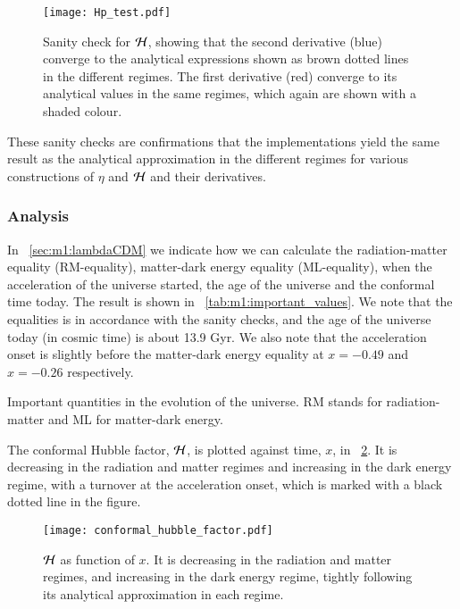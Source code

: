    \begin{figure}
        \texttt{[image: Hp\_test.pdf]}
        \caption{Sanity check for $\mathcal{H}$, showing that the second derivative (blue) converge to the analytical expressions shown as brown dotted lines in the different regimes. The first derivative (red) converge to its analytical values in the same regimes, which again are shown with a shaded colour.}
        \label{fig:m1:Hp_tests}
    \end{figure}

    These sanity checks are confirmations that the implementations yield the same result as the analytical approximation in the different regimes for various constructions of $\eta$ and $\mathcal{H}$ and their derivatives.
    
\subsubsection{Analysis}

    In ~\cref{sec:m1:lambdaCDM} we indicate how we can calculate the radiation-matter equality (RM-equality), matter-dark energy equality (ML-equality), when the acceleration of the universe started, the age of the universe and the conformal time today. The result is shown in ~\cref{tab:m1:important_values}. We note that the equalities is in accordance with the sanity checks, and the age of the universe today (in cosmic time) is about 13.9 Gyr. We also note that the acceleration onset is slightly before the matter-dark energy equality at $x=-0.49$ and $x=-0.26$ respectively. 
    \begin{table}
        
        \caption{Important quantities in the evolution of the universe. RM stands for radiation-matter and ML for matter-dark energy.}
        \label{tab:m1:important_values}
    \end{table}

    The conformal Hubble factor, $\mathcal{H}$, is plotted against time, $x$, in ~\cref{fig:m1:conformal_hubble_factor_Hp}. It is decreasing in the radiation and matter regimes and increasing in the dark energy regime, with a turnover at the acceleration onset, which is marked with a black dotted line in the figure. 
    \begin{figure}
        \texttt{[image: conformal\_hubble\_factor.pdf]}
        \caption{$\mathcal{H}$ as function of $x$. It is decreasing in the radiation and matter regimes, and increasing in the dark energy regime, tightly following its analytical approximation in each regime.}
        \label{fig:m1:conformal_hubble_factor_Hp}
    \end{figure}

